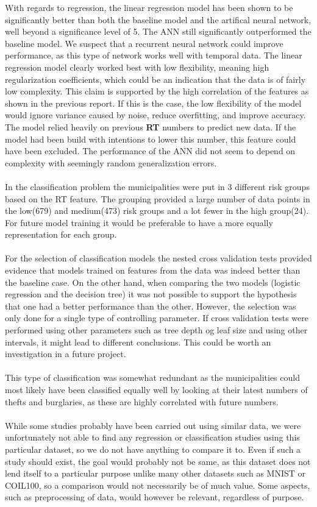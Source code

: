 With regards to regression, the linear regression model has been shown to be significantly better than both the baseline model and the artifical neural network, well beyond a significance level of 5\pro. The ANN still significantly outperformed the baseline model.
We suspect that a recurrent neural network could improve performance, as this type of network works well with temporal data.
The linear regression model clearly worked best with low flexibility, meaning high regularization coefficients, which could be an indication that the data is of fairly low complexity.
This claim is supported by the high correlation of the features as shown in the previous report.
If this is the case, the low flexibility of the model would ignore variance caused by noise, reduce overfitting, and improve accuracy. The model relied heavily on previous \textbf{RT} numbers to predict new data. If the model had been build with  intentions to lower this number, this feature could have been excluded. 
The performance of the ANN did not seem to depend on complexity with seemingly random generalization errors. \\
\\
In the classification problem the municipalities were put in 3 different risk groups based on the RT feature.
The grouping provided a large number of data points in the low(679) and medium(473) risk groups and a lot fewer in the high group(24).
For future model training it would be preferable to have a more equally representation for each group.\\
\\
For the selection of classification models the nested cross validation tests provided evidence that models trained on features from the data was indeed better than the baseline case. On the other hand, when comparing the two models (logistic regression and the decision tree) it was not possible to support the hypothesis that one had a better performance than the other. However, the selection was only done for a single type of controlling parameter. If cross validation tests were performed using other parameters such as tree depth og leaf size and using other intervals, it might lead to different conclusions. This could be worth an investigation in a future project.\\
\\
This type of classification was somewhat redundant as the municipalities could most likely have been classified equally well by looking at their latest numbers of thefts and burglaries, as these are highly correlated with future numbers.\\
\\
While some studies probably have been carried out using similar data, we were unfortunately not able to find any regression or classification studies using this particular dataset, so we do not have anything to compare it to. Even if such a study should exist, the goal would probably not be same, as this dataset does not lend itself to a particular purpose unlike many other datasets such as MNIST or COIL100, so a comparison would not necessarily be of much value. Some aspects, such as preprocessing of data, would however be relevant, regardless of purpose.

